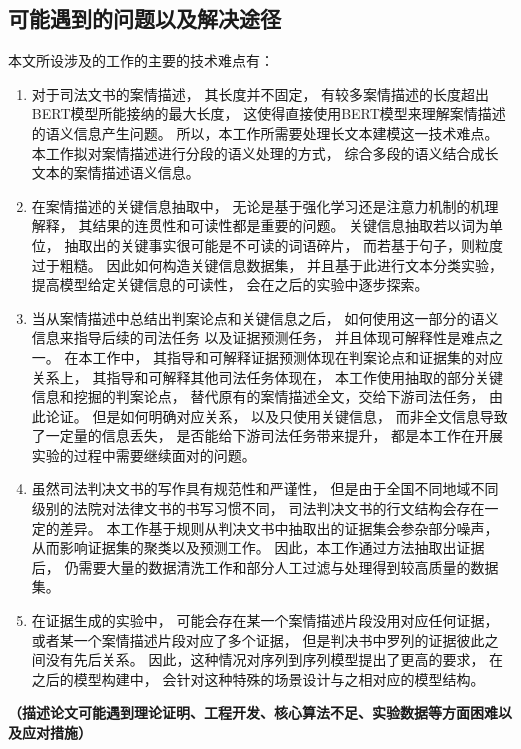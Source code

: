 \subsection{可能遇到的问题以及解决途径}
本文所设涉及的工作的主要的技术难点有：
\begin{enumerate}
    \item
          对于司法文书的案情描述，
          其长度并不固定，
          有较多案情描述的长度超出BERT模型所能接纳的最大长度，
          这使得直接使用BERT模型来理解案情描述的语义信息产生问题。
          所以，本工作所需要处理长文本建模这一技术难点。
          本工作拟对案情描述进行分段的语义处理的方式，
          综合多段的语义结合成长文本的案情描述语义信息。

    \item
          在案情描述的关键信息抽取中，
          无论是基于强化学习还是注意力机制的机理解释，
          其结果的连贯性和可读性都是重要的问题。
          关键信息抽取若以词为单位，
          抽取出的关键事实很可能是不可读的词语碎片，
          而若基于句子，则粒度过于粗糙。
          因此如何构造关键信息数据集，
          并且基于此进行文本分类实验，
          提高模型给定关键信息的可读性，
          会在之后的实验中逐步探索。

    \item
          当从案情描述中总结出判案论点和关键信息之后，
          如何使用这一部分的语义信息来指导后续的司法任务
          以及证据预测任务，
          并且体现可解释性是难点之一。
          在本工作中，
          其指导和可解释证据预测体现在判案论点和证据集的对应关系上，
          其指导和可解释其他司法任务体现在，
          本工作使用抽取的部分关键信息和挖掘的判案论点，
          替代原有的案情描述全文，交给下游司法任务，
          由此论证。
          但是如何明确对应关系，
          以及只使用关键信息，
          而非全文信息导致了一定量的信息丢失，
          是否能给下游司法任务带来提升，
          都是本工作在开展实验的过程中需要继续面对的问题。

    \item
          虽然司法判决文书的写作具有规范性和严谨性，
          但是由于全国不同地域不同级别的法院对法律文书的书写习惯不同，
          司法判决文书的行文结构会存在一定的差异。
          本工作基于规则从判决文书中抽取出的证据集会参杂部分噪声，
          从而影响证据集的聚类以及预测工作。
          因此，本工作通过方法抽取出证据后，
          仍需要大量的数据清洗工作和部分人工过滤与处理得到较高质量的数据集。

    \item
          在证据生成的实验中，
          可能会存在某一个案情描述片段没用对应任何证据，
          或者某一个案情描述片段对应了多个证据，
          但是判决书中罗列的证据彼此之间没有先后关系。
          因此，这种情况对序列到序列模型提出了更高的要求，
          在之后的模型构建中，
          会针对这种特殊的场景设计与之相对应的模型结构。


\end{enumerate}

\textbf{\color{red}
    （描述论文可能遇到理论证明、工程开发、核心算法不足、实验数据等方面困难以及应对措施）}